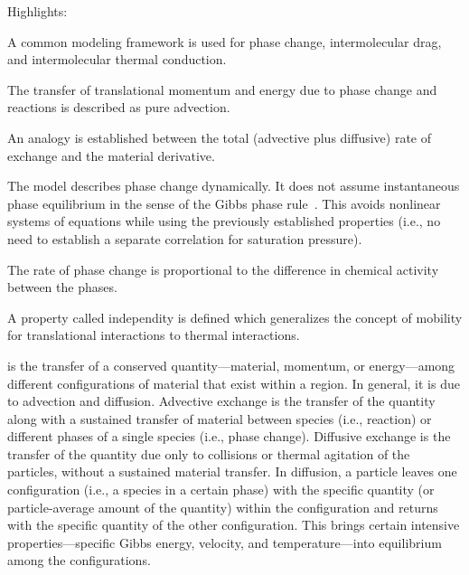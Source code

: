 \begin{contextbox}%
  Highlights:
  \begin{itemize*}
    \item A common modeling framework is used for phase change, intermolecular drag, and intermolecular thermal conduction.
    \item The transfer of translational momentum and energy due to phase change and reactions is described as pure advection.
    \item An analogy is established between the total (advective plus diffusive) rate of exchange and the material derivative.
    \item The model describes phase change dynamically.  It does not assume instantaneous phase equilibrium in the sense of the Gibbs phase rule~\cite{Moran2004, Bejan2006}.  This avoids nonlinear systems of equations while using the previously established properties (i.e., no need to establish a separate correlation for saturation pressure).
    \item The rate of phase change is proportional to the difference in chemical activity between the phases.
    \item A property called independity is defined which generalizes the concept of mobility for translational interactions to thermal interactions.
  \end{itemize*}
\end{contextbox}


\emph{} is the transfer of a conserved quantity---material, momentum, or energy---among different configurations of material that exist within a region.  In general, it is due to advection and diffusion.  Advective exchange is the transfer of the quantity along with a sustained transfer of material between species (i.e., reaction) or different phases of a single species (i.e., phase change).  Diffusive exchange is the transfer of the quantity due only to collisions or thermal agitation of the particles, without a sustained material transfer.  In diffusion, a particle leaves one configuration (i.e., a species in a certain phase) with the specific quantity (or particle-average amount of the quantity) within the configuration and returns with the specific quantity of the other configuration.  This brings certain intensive properties---specific Gibbs energy, velocity, and temperature---into equilibrium among the configurations.



